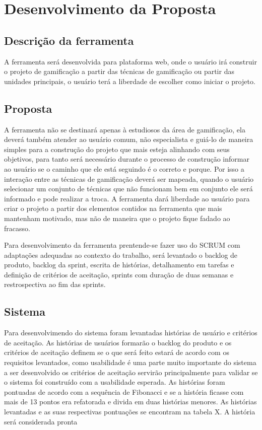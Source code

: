 
\chapter[Desenvolvimento da Proposta]{Desenvolvimento da Proposta}

\section{Descrição da ferramenta}

	A ferramenta será desenvolvida para plataforma web, onde o usuário irá construir o projeto de gamificação a partir das técnicas de gamificação ou partir das unidades principais, o usuário terá a liberdade de escolher como iniciar o projeto. 

\section{Proposta}

A ferramenta não se destinará apenas à estudiosos da área de gamificação, ela deverá também atender ao usuário comum, não especialista e guiá-lo de maneira simples para a construção do projeto que mais esteja alinhando com seus objetivos, para tanto será necessário durante o processo de construção informar ao usuário se o caminho que ele está seguindo é o correto e porque. Por isso a interação entre as técnicas de gamificação deverá ser mapeada, quando o usuário selecionar um conjunto de técnicas que não funcionam bem em conjunto ele será informado e pode realizar a troca. A ferramenta dará  liberdade ao usuário para criar o projeto a partir dos elementos contidos na ferramenta que mais mantenham motivado, mas não de maneira que o projeto fique fadado ao fracasso.

Para desenvolvimento da ferramenta prentende-se fazer uso do SCRUM com adaptações adequadas ao contexto do trabalho, será levantado o backlog de produto, backlog da sprint, escrita de histórias, detalhamento em tarefas e definição de critérios de aceitação, sprints com duração de duas semanas e restrospectiva ao fim das sprints.

\section{Sistema}

Para desenvolvimendo do sistema foram levantadas histórias de usuário e critérios de aceitação. As histórias de usuários formarão o backlog do produto e os critérios de aceitação definem se o que será feito estará de acordo com os requisitos levantados, como usabilidade é uma parte muito importante do sistema a ser desenvolvido os critérios de aceitação servirão principalmente para validar se o sistema foi construído com a usabilidade esperada. As histórias foram pontuadas de acordo com a sequência de Fibonacci e se a história ficasse com mais de 13 pontos era refatorada e divida em duas histórias menores. As histórias levantadas e as suas respectivas pontuações se encontram na tabela X. A história será considerada pronta 

